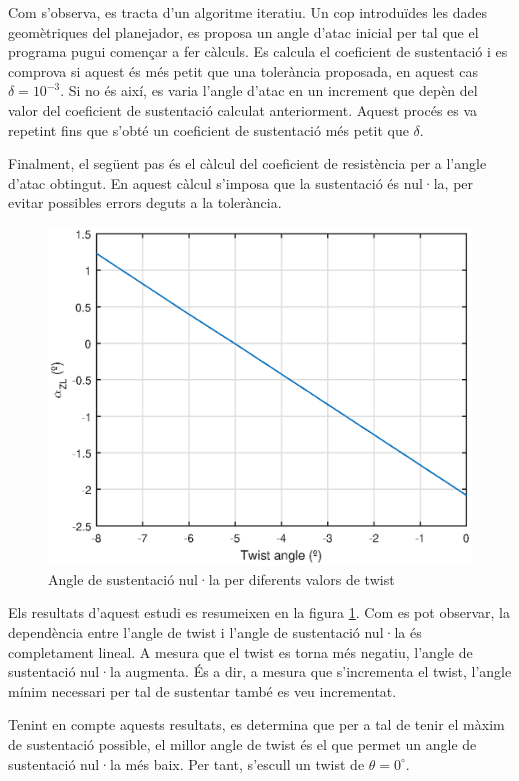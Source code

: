 Com s'observa, es tracta d'un algoritme iteratiu. Un cop introduïdes les dades geomètriques del planejador, es proposa un angle d'atac inicial per tal que el programa pugui començar a fer càlculs. Es calcula el coeficient de sustentació i es comprova si aquest és més petit que una tolerància proposada, en aquest cas $\delta=10^{-3}$. Si no és així, es varia l'angle d'atac en un increment que depèn del valor del coeficient de sustentació calculat anteriorment. Aquest procés es va repetint fins que s'obté un coeficient de sustentació més petit que $\delta$.

Finalment, el següent pas és el càlcul del coeficient de resistència per a l'angle d'atac obtingut. En aquest càlcul s'imposa que la sustentació és nul·la, per evitar possibles errors deguts a la tolerància.

\begin{figure}[h]
	\centering
	\includegraphics{./plots/zlangle}
	\caption{Angle de sustentació nul·la per diferents valors de twist}
	\label{zla}
\end{figure}

Els resultats d'aquest estudi es resumeixen en la figura \ref{zla}. Com es pot observar, la dependència entre l'angle de twist i l'angle de sustentació nul·la és completament lineal. A mesura que el twist es torna més negatiu, l'angle de sustentació nul·la augmenta. És a dir, a mesura que s'incrementa el twist, l'angle mínim necessari per tal de sustentar també es veu incrementat.

Tenint en compte aquests resultats, es determina que per a tal de tenir el màxim de sustentació possible, el millor angle de twist és el que permet un angle de sustentació nul·la més baix. Per tant, s'escull un twist de $\theta=0^{\circ}$.

